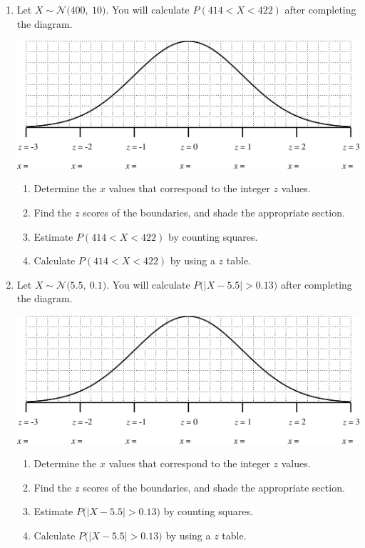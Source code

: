 \documentclass[12pt,letterpaper]{article}
\newcommand{\N}[2]{\mathcal{N}\big(#1,~#2\big)}
\begin{document}
\begin{enumerate}
\item Let $X\sim \N{400}{10}$. You will calculate $P(414 < X < 422)$ after completing the diagram.
\begin{center}
\includegraphics[scale=.8]{figures/curve.png}
\end{center}
\begin{enumerate}
\item Determine the $x$ values that correspond to the integer $z$ values.
\item Find the $z$ scores of the boundaries, and shade the appropriate section.
\item Estimate $P(414 < X < 422)$ by counting squares.
\vspace{30pt}
\item Calculate $P(414 < X < 422)$ by using a $z$ table.
\end{enumerate}
 \vfill
 
\item Let $X\sim \N{5.5}{0.1}$. You will calculate $P\Big(\big|X-5.5 \big| > 0.13 \Big)$ after completing the diagram.
\begin{center}
\includegraphics[scale=.8]{figures/curve.png}
\end{center}
\begin{enumerate}
\item Determine the $x$ values that correspond to the integer $z$ values.
\item Find the $z$ scores of the boundaries, and shade the appropriate section.
\item Estimate $P\Big(\big|X-5.5 \big| > 0.13 \Big)$ by counting squares.
\vspace{30pt}
\item Calculate $P\Big(\big|X-5.5 \big| > 0.13 \Big)$ by using a $z$ table.
\end{enumerate}
\vfill


\end{enumerate}
\end{document}
